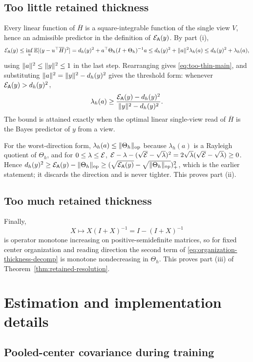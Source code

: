 \subsection{Too little retained thickness}

Every linear function of $\overline H$ is a square-integrable function of the single view
$V$, hence an admissible predictor in the definition of $\mathcal{E}_{\mathsf A}(y)$. By part (i),
\[
\mathcal{E}_{\mathsf A}(y)
\le
\inf_u\mathbb{E}[(y-u^\top\overline H)^2]
=
d_h(y)^2+a^\top\Theta_h(I+\Theta_h)^{-1}a
\le
d_h(y)^2+\lVert a\rVert^2\lambda_h(a)
\le
d_h(y)^2+\lambda_h(a),
\]
using $\lVert a\rVert^2\le\lVert y\rVert^2\le1$ in the last step. Rearranging gives
\eqref{eq:too-thin-main}, and substituting $\lVert a\rVert^2=\lVert y\rVert^2-d_h(y)^2$ gives the
threshold form: whenever $\mathcal{E}_{\mathsf A}(y)>d_h(y)^2$,
\[
\lambda_h(a)\ge\frac{\mathcal{E}_{\mathsf A}(y)-d_h(y)^2}{\lVert y\rVert^2-d_h(y)^2}.
\]
The bound is attained exactly when the optimal linear single-view read of $\overline H$
is the Bayes predictor of $y$ from a view.

For the worst-direction form, $\lambda_h(a)\le\lVert \Theta_h\rVert_{\rm op}$ because
$\lambda_h(a)$ is a Rayleigh quotient of $\Theta_h$, and for $0\le\lambda\le\mathcal{E}$,
$\mathcal{E}-\lambda-(\sqrt{\mathcal{E}}-\sqrt{\lambda})^2=2\sqrt{\lambda}(\sqrt{\mathcal{E}}-\sqrt{\lambda})\ge0$.
Hence $d_h(y)^2\ge\mathcal{E}_{\mathsf A}(y)-\lVert \Theta_h\rVert_{\rm op}\ge(\sqrt{\mathcal{E}_{\mathsf A}(y)}-\sqrt{\lVert \Theta_h\rVert_{\rm op}})_+^2$,
which is the earlier statement; it discards the direction and is never tighter. This
proves part (ii).

\subsection{Too much retained thickness}

Finally,
\[
X\mapsto X(I+X)^{-1}=I-(I+X)^{-1}
\]
is operator monotone increasing on positive-semidefinite matrices, so for fixed center
organization and reading direction the second term of
\eqref{eq:organization-thickness-decomp} is monotone nondecreasing in $\Theta_h$. This
proves part (iii) of Theorem~\ref{thm:retained-resolution}.

\section{Estimation and implementation details}\label{app:experiments}

\subsection{Pooled-center covariance during training}

